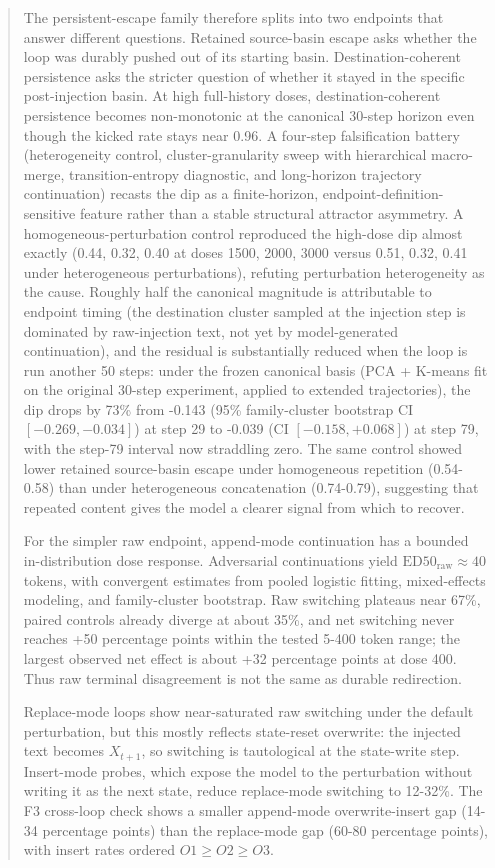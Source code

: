 \documentclass{article}
\theoremstyle{plain}
\theoremstyle{definition}
\begin{document}
\begin{abstract}
The persistent-escape family therefore splits into two endpoints that answer different questions. Retained source-basin escape asks whether the loop was durably pushed out of its starting basin. Destination-coherent persistence asks the stricter question of whether it stayed in the specific post-injection basin. At high full-history doses, destination-coherent persistence becomes non-monotonic at the canonical 30-step horizon even though the kicked rate stays near 0.96. A four-step falsification battery (heterogeneity control, cluster-granularity sweep with hierarchical macro-merge, transition-entropy diagnostic, and long-horizon trajectory continuation) recasts the dip as a finite-horizon, endpoint-definition-sensitive feature rather than a stable structural attractor asymmetry. A homogeneous-perturbation control reproduced the high-dose dip almost exactly (0.44, 0.32, 0.40 at doses 1500, 2000, 3000 versus 0.51, 0.32, 0.41 under heterogeneous perturbations), refuting perturbation heterogeneity as the cause. Roughly half the canonical magnitude is attributable to endpoint timing (the destination cluster sampled at the injection step is dominated by raw-injection text, not yet by model-generated continuation), and the residual is substantially reduced when the loop is run another 50 steps: under the frozen canonical basis (PCA + K-means fit on the original 30-step experiment, applied to extended trajectories), the dip drops by 73\% from -0.143 (95\% family-cluster bootstrap CI $[-0.269,-0.034]$) at step 29 to -0.039 (CI $[-0.158,+0.068]$) at step 79, with the step-79 interval now straddling zero. The same control showed lower retained source-basin escape under homogeneous repetition (0.54-0.58) than under heterogeneous concatenation (0.74-0.79), suggesting that repeated content gives the model a clearer signal from which to recover.

For the simpler raw endpoint, append-mode continuation has a bounded in-distribution dose response. Adversarial continuations yield $\mathrm{ED50}_{\mathrm{raw}}\approx 40$ tokens, with convergent estimates from pooled logistic fitting, mixed-effects modeling, and family-cluster bootstrap. Raw switching plateaus near 67\%, paired controls already diverge at about 35\%, and net switching never reaches +50 percentage points within the tested 5-400 token range; the largest observed net effect is about +32 percentage points at dose 400. Thus raw terminal disagreement is not the same as durable redirection.

Replace-mode loops show near-saturated raw switching under the default perturbation, but this mostly reflects state-reset overwrite: the injected text becomes \(X_{t+1}\), so switching is tautological at the state-write step. Insert-mode probes, which expose the model to the perturbation without writing it as the next state, reduce replace-mode switching to 12-32\%. The F3 cross-loop check shows a smaller append-mode overwrite-insert gap (14-34 percentage points) than the replace-mode gap (60-80 percentage points), with insert rates ordered $O1 \ge O2 \ge O3$.


\end{abstract}
\end{document}
